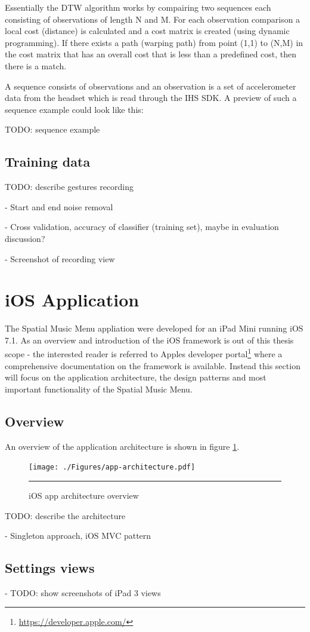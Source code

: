 Essentially the DTW algorithm works by compairing two sequences each consisting of observations of length N and M. For each observation comparison a local cost (distance) is calculated and a cost matrix is created (using dynamic programming). If there exists a path (warping path) from point (1,1) to (N,M) in the cost matrix that has an overall cost that is less than a predefined cost, then there is a match.


A sequence consists of observations and an observation is a set of accelerometer data from the headset which is read through the IHS SDK. A preview of such a sequence example could look like this:

TODO: sequence example

\subsection{Training data}



TODO: describe gestures recording

- Start and end noise removal

- Cross validation, accuracy of classifier (training set), maybe in evaluation discussion?

- Screenshot of recording view


\section{iOS Application}
The Spatial Music Menu appliation were developed for an iPad Mini running iOS 7.1. As an overview and introduction of the iOS framework is out of this thesis scope - the interested reader is referred to Apples developer portal\footnote{\url{https://developer.apple.com/}} where a comprehensive documentation on the framework is available. Instead this section will focus on the application architecture, the design patterns and most important functionality of the Spatial Music Menu.

\subsection{Overview}
An overview of the application architecture is shown in figure \ref{fig:apparchitecture}.

\begin{figure}[t]
	\centering
		\texttt{[image: ./Figures/app-architecture.pdf]}
		\rule{35em}{1pt}
	\caption[App architecture]{iOS app architecture overview}
	\label{fig:apparchitecture}
\end{figure}

TODO: describe the architecture

- Singleton approach, iOS MVC pattern

\subsection{Settings views}
- TODO: show screenshots of iPad 3 views








